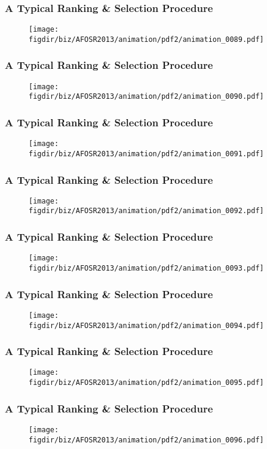 \documentclass[13pt]{beamer}
\newcommand{\figdir}{../../fig}
\begin{document}
\begin{frame}\frametitle{A Typical Ranking \& Selection Procedure}\begin{figure}\texttt{[image: \\figdir/biz/AFOSR2013/animation/pdf2/animation\_0089.pdf]}\end{figure}\end{frame}
\begin{frame}\frametitle{A Typical Ranking \& Selection Procedure}\begin{figure}\texttt{[image: \\figdir/biz/AFOSR2013/animation/pdf2/animation\_0090.pdf]}\end{figure}\end{frame}
\begin{frame}\frametitle{A Typical Ranking \& Selection Procedure}\begin{figure}\texttt{[image: \\figdir/biz/AFOSR2013/animation/pdf2/animation\_0091.pdf]}\end{figure}\end{frame}
\begin{frame}\frametitle{A Typical Ranking \& Selection Procedure}\begin{figure}\texttt{[image: \\figdir/biz/AFOSR2013/animation/pdf2/animation\_0092.pdf]}\end{figure}\end{frame}
\begin{frame}\frametitle{A Typical Ranking \& Selection Procedure}\begin{figure}\texttt{[image: \\figdir/biz/AFOSR2013/animation/pdf2/animation\_0093.pdf]}\end{figure}\end{frame}
\begin{frame}\frametitle{A Typical Ranking \& Selection Procedure}\begin{figure}\texttt{[image: \\figdir/biz/AFOSR2013/animation/pdf2/animation\_0094.pdf]}\end{figure}\end{frame}
\begin{frame}\frametitle{A Typical Ranking \& Selection Procedure}\begin{figure}\texttt{[image: \\figdir/biz/AFOSR2013/animation/pdf2/animation\_0095.pdf]}\end{figure}\end{frame}
\begin{frame}\frametitle{A Typical Ranking \& Selection Procedure}\begin{figure}\texttt{[image: \\figdir/biz/AFOSR2013/animation/pdf2/animation\_0096.pdf]}\end{figure}\end{frame}
\end{document}
